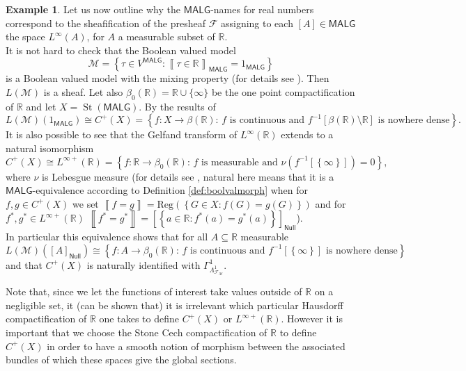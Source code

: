 \documentclass[11pt]{amsart}
\newcommand{\F}{\mathcal{F}}
\newcommand{\malg}{\bool{MALG}}
\theoremstyle{plain}
\theoremstyle{definition}
\newtheorem{example}[theorem]{Example}
\theoremstyle{plain}
\theoremstyle{remark}
\newcommand{\M}{\mathcal{M}}
\DeclareMathOperator{\St}{St}
\newcommand{\bool}[1]{\mathsf{#1}}
\newcommand{\Reg}[1]{\mathrm{Reg}\left(#1\right)}
\newcommand{\Qp}[1]{\left\llbracket #1 \right\rrbracket}
\newcommand{\bp}[1]{\left\lbrace #1 \right\rbrace}
\newcommand{\0}{\mathsf{0}}
\renewcommand{\1}{\mathsf{1}}
\renewcommand{\2}{\mathsf{2}}
\theoremstyle{definition}
\begin{document}
\begin{example}\label{exm:sheafLR}
Let us now outline why the $\bool{MALG}$-names for real numbers correspond to the sheafification of the presheaf 
$\F$ assigning to each $[A]\in\bool{MALG}$ the space $L^\infty(A)$, for $A$ a measurable subset of $\mathbb{R}$.\\
It is not hard to check that the Boolean valued model 
\[
\M=\bp{\tau\in V^\bool{MALG}: \Qp{\tau\in\mathbb{R}}_\bool{MALG}=1_\bool{MALG}}
\]
is a Boolean valued model with the mixing property (for details see \cite{VIAVAC15}). 
Then $L(\M)$ is a sheaf. 
Let also $\beta_0(\mathbb{R})=\mathbb{R}\cup\{\infty\}$ be the one point compactification of $\mathbb{R}$ and let $X=\St(\malg)$.
By the results of \cite{MR779056,MR759416,VIAVAC15} 
\[
L(\M)(1_\malg)\cong C^+(X)=\bp{f:X\to\beta(\mathbb{R}): \, f\text{ is continuous and }f^{-1}[\beta(\mathbb{R})\setminus\mathbb{R}]\text{ is nowhere dense}}.
\]
It is also possible to see that the Gelfand transform of $L^\infty(\mathbb{R})$ extends to a natural isomorphism 
\[
C^+(X)\cong L^{\infty+}(\mathbb{R})=\bp{f:\mathbb{R}\to\beta_0(\mathbb{R}):\,f\text{ is measurable and } \nu(f^{-1}[\bp{\infty}])=0},
\]
where $\nu$ is Lebesgue measure (for details see  \cite{VIAVAC15}, natural here means that it is a $\bool{MALG}$-equivalence according to Definition \ref{def:boolvalmorph} when for $f,g\in C^+(X)$ we set $\Qp{f=g}=\Reg{\bp{G\in X: f(G)=g(G)}}$ and for 
$f^*,g^*\in L^{\infty+}(\mathbb{R})$ $\Qp{f^*=g^*}=[\bp{a\in \mathbb{R}: f^*(a)=g^*(a)}]_{\mathsf{Null}}$).\\
In particular this equivalence shows that for all $A\subseteq\mathbb{R}$ measurable
\[
L(\M)([A]_{\mathsf{Null}})\cong\bp{f:A\to\beta_0(\mathbb{R}): \, f\text{ is continuous and }f^{-1}[\bp{\infty}]\text{ is nowhere dense}}
\]
and that $C^+(X)$ is naturally identified with $\Gamma^1_{\Lambda^1_{\F_\M}}$.

Note that, since we let the functions of interest take values outside of $\mathbb{R}$ on a negligible set, it (can be shown that) it is irrelevant which particular Hausdorff compactification of $\mathbb{R}$ one takes to define $C^+(X)$ or $L^{\infty+}(\mathbb{R})$. However it is important that we choose the Stone Cech compactification of $\mathbb{R}$ to define $C^+(X)$ in order to have a smooth notion of morphism between the associated bundles of which these spaces give the global sections.
\end{example}





	

\end{document}
